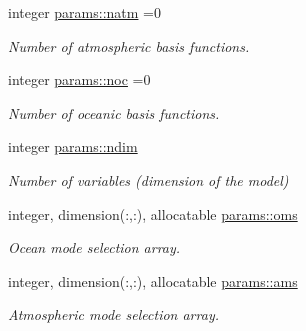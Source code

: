 \begin{DoxyCompactItemize}
integer \hyperlink{namespaceparams_a4f46551b6a8ad183d2dced1da3dc5fed}{params\+::natm} =0
\begin{DoxyCompactList}\small\item\em Number of atmospheric basis functions. \end{DoxyCompactList}\item 
integer \hyperlink{namespaceparams_acdb6ef89bcada9ba7b6b6bba575b60f4}{params\+::noc} =0
\begin{DoxyCompactList}\small\item\em Number of oceanic basis functions. \end{DoxyCompactList}\item 
integer \hyperlink{namespaceparams_a2323fe1773f086e20c14f266351c482b}{params\+::ndim}
\begin{DoxyCompactList}\small\item\em Number of variables (dimension of the model) \end{DoxyCompactList}\item 
integer, dimension(\+:,\+:), allocatable \hyperlink{namespaceparams_a5e25e072992d5908eea5308243b7ec63}{params\+::oms}
\begin{DoxyCompactList}\small\item\em Ocean mode selection array. \end{DoxyCompactList}\item 
integer, dimension(\+:,\+:), allocatable \hyperlink{namespaceparams_aa95299f1a9c54693b85e049004369089}{params\+::ams}
\begin{DoxyCompactList}\small\item\em Atmospheric mode selection array. \end{DoxyCompactList}\end{DoxyCompactItemize}
